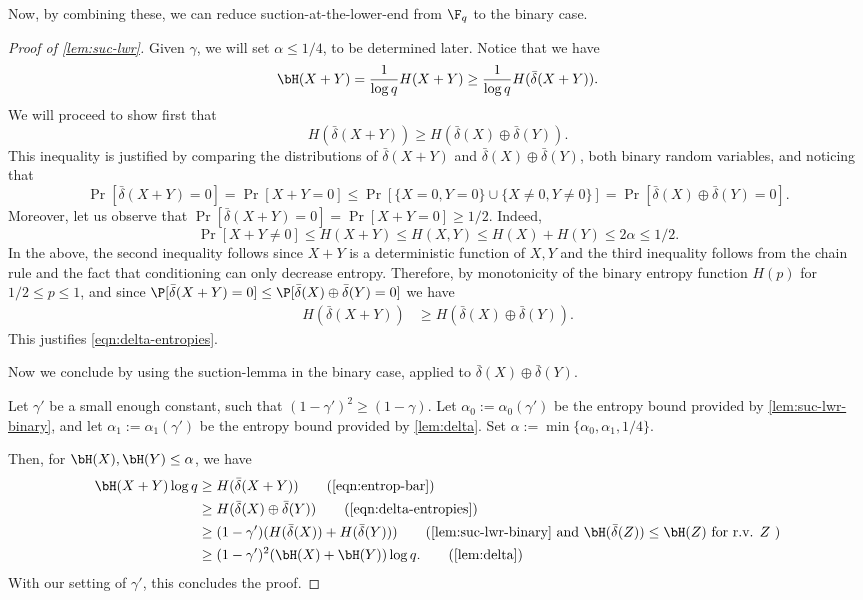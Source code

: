 \documentclass[11pt]{article}
\newcommand{\df}{\bar{\delta}}
\begin{document}
Now, by combining these, we can reduce suction-at-the-lower-end from $\F_q$ to the binary case.
\begin{proof}[Proof of \cref{lem:suc-lwr}]
	Given $\gamma$, we will set $\alpha \leq 1/4$, to be determined later.
	Notice that we have
	\begin{equation}
		\label{eqn:entrop-bar}
		\bH(X+Y) = \frac{1}{\log q} H(X + Y) \geq \frac{1}{\log 	q} H(\df(X+Y)).
	\end{equation}
	We will proceed to show first that
	\begin{equation}
		\label{eqn:delta-entropies} H(\df(X+Y)) \geq H(\df(X) \oplus \df(Y)).
	\end{equation}
	This inequality is justified by comparing the distributions of $\df(X+Y)$ and $\df(X) \oplus \df(Y)$, both binary random variables, and noticing that
	$$\Pr[\df(X+Y) = 0] = \Pr[X + Y = 0] \leq
	\Pr[\{X = 0, Y = 0\} \cup \{X \neq 0, Y \neq 0\}]
	=\Pr[\df(X) \oplus \df(Y) = 0].$$
	Moreover, let us observe that
	$\Pr[\df(X + Y) = 0]  = \Pr[X + Y = 0] \geq 1/2$. Indeed,
	\begin{equation*}
		\Pr[X + Y \neq 0] \leq H(X+Y) \leq H(X, Y) \leq H(X)+H(Y) \le 2\alpha \leq 1/2.
	\end{equation*}
	In the above, the second inequality follows since $X+Y$ is a deterministic function of $X,Y$ and the third inequality follows from the chain rule and the fact that conditioning can only decrease entropy.
	Therefore, by monotonicity of the binary entropy function $H(p)$ for $1/2 \leq p \leq 1$,
	and since $\P[\df(X + Y) = 0] \leq \P[\df(X) \oplus \df(Y) = 0]$
	we have
	\begin{align*}
		H(\df(X+Y) ) &\geq H(\df(X) \oplus \df(Y)).
	\end{align*}
	This justifies \cref{eqn:delta-entropies}.
	
	Now we conclude by using the suction-lemma in the binary case, applied to $\df(X) \oplus \df(Y)$.
	
	Let $\gamma'$ be a small enough constant, such that
	$(1-\gamma')^2 \geq (1-\gamma)$.
	Let $\alpha_0 := \alpha_0(\gamma')$ be the entropy bound provided by \cref{lem:suc-lwr-binary},
	and let $\alpha_1 := \alpha_1(\gamma')$ be the entropy bound provided by \cref{lem:delta}.
	Set $\alpha := \min\{\alpha_0, \alpha_1, 1/4\}$.
	
	Then, for $\bH(X), \bH(Y) \leq \alpha$, we have
	\begin{align*}
		\bH(X+Y) \log q & \geq H(\df(X + Y)) \tag{\cref{eqn:entrop-bar}} \\
		& \geq H(\df(X) \oplus \df(Y)) \tag{\cref{eqn:delta-entropies}} \\
		&\geq (1-\gamma')(H(\df(X)) + H(\df(Y)))
		\tag{\cref{lem:suc-lwr-binary} and $\bH(\df(Z))\le \bH(Z)$ for r.v. $Z$ }\\
		&\geq (1-\gamma')^2(\bH(X) + \bH(Y))\log q.
		\tag{\cref{lem:delta}}
	\end{align*}
	With our setting of $\gamma'$, this concludes the proof.
\end{proof}
\end{document}

